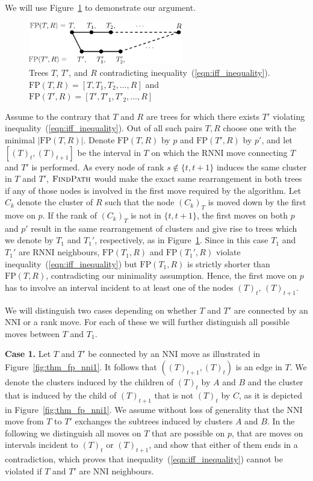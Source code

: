 \documentclass{amsart}
\newcommand{\rnni}{\mathrm{RNNI}}
\newcommand{\findpath}{\textsc{FindPath}}
\newcommand{\nni}{\mathrm{NNI}}
\newcommand{\fp}{\mathrm{FP}}
\begin{document}
We will use Figure~\ref{fig:proof_idea} to demonstrate our argument.

\begin{figure}[!hbt]
\centering
\includegraphics[width=0.6\textwidth]{proof_idea}
\vspace{12pt}
\caption{Trees $T$, $T'$, and $R$ contradicting inequality~(\ref{eqn:iff_inequality}).
$\fp(T,R) = [T,T_1,T_2, \ldots, R]$ and $\fp(T',R) = [T',T'_1,T'_2, \ldots, R]$}
\label{fig:proof_idea}
\end{figure}

Assume to the contrary that $T$ and $R$ are trees for which there exists $T'$ violating inequality~(\ref{eqn:iff_inequality}).
Out of all such pairs $T, R$ choose one with the minimal $|\fp(T, R)|$.
Denote $\fp(T,R)$ by $p$ and $\fp(T', R)$ by $p'$, and let $[(T)_t, (T)_{t+1}]$ be the interval in $T$ on which the $\rnni$ move connecting $T$ and $T'$ is performed.
As every node of rank $s \notin \{t, t+1\}$ induces the same cluster in $T$ and $T'$, $\findpath$ would make the exact same rearrangement in both trees if any of those nodes is involved in the first move required by the algorithm.
Let $C_k$ denote the cluster of $R$ such that the node $(C_k)_T$ is moved down by the first move on $p$.
If the rank of $(C_k)_T$ is not in $\{t, t+1\}$, the first moves on both $p$ and $p'$ result in the same rearrangement of clusters and give rise to trees which we denote by $T_1$ and $T_1'$, respectively, as in Figure~\ref{fig:proof_idea}.
Since in this case $T_1$ and $T_1'$ are $\rnni$ neighbours, $\fp(T_1, R)$  and $\fp(T_1', R)$ violate inequality~(\ref{eqn:iff_inequality}) but $\fp(T_1, R)$ is strictly shorter than $\fp(T, R)$, contradicting our minimality assumption.
Hence, the first move on $p$ has to involve an interval incident to at least one of the nodes $(T)_t$, $(T)_{t+1}$.

We will distinguish two cases depending on whether $T$ and $T'$ are connected by an $\nni$ or a rank move.
For each of these we will further distinguish all possible moves between $T$ and $T_1$.

\textbf{Case 1.} Let $T$ and $T'$ be connected by an $\nni$ move as illustrated in Figure~\ref{fig:thm_fp_nni1}.
It follows that $((T)_{t+1},(T)_t)$ is an edge in $T$.
We denote the clusters induced by the children of $(T)_t$ by $A$ and $B$ and the cluster that is induced by the child of $(T)_{t+1}$ that is not $(T)_t$ by $C$, as it is depicted in Figure~\ref{fig:thm_fp_nni1}.
We assume without loss of generality that the $\nni$ move from $T$ to $T'$ exchanges the subtrees induced by clusters $A$ and $B$.
In the following we distinguish all moves on $T$ that are possible on $p$, that are moves on intervals incident to $(T)_t$ or $(T)_{t+1}$, and show that either of them ends in a contradiction, which proves that inequality~(\ref{eqn:iff_inequality}) cannot be violated if $T$ and $T'$ are $\nni$ neighbours.
\end{document}
